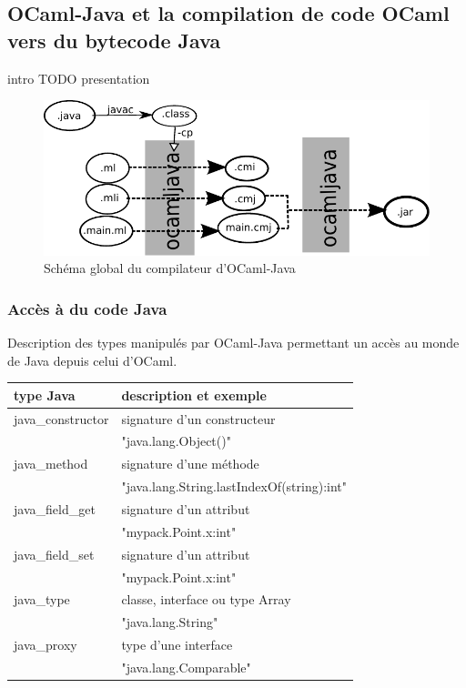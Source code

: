 \documentclass[a4paper, 11pt, notitlepage]{article}
\begin{document}

\newpage
\subsection{OCaml-Java et la compilation de code OCaml vers du bytecode Java}
intro TODO presentation

\begin{figure}[h]
  \centering
  \includegraphics{schemaOCamlJava.pdf}
  \caption{Schéma global du compilateur d'OCaml-Java}
\end{figure}

\subsubsection{Accès à du code Java}
\noindent
Description des types manipulés par OCaml-Java permettant un accès au
monde de Java depuis celui d'OCaml.  

\begin{tabular}{|l|l|}
  \hline
  type Java & description et exemple \\
  \hline
  java\_constructor & signature d'un constructeur  \\
  &  "java.lang.Object()" \\
  \hline
  java\_method & signature d'une méthode \\
  & "java.lang.String.lastIndexOf(string):int"\\
  \hline
  java\_field\_get & signature d'un attribut\\
  & "mypack.Point.x:int" \\
  \hline
  java\_field\_set & signature d'un attribut\\
  & "mypack.Point.x:int" \\
  \hline
  java\_type & classe, interface ou type Array\\
  & "java.lang.String"\\
  \hline
  java\_proxy & type d'une interface\\
  & "java.lang.Comparable"\\ 
  \hline
\end{tabular}
\end{document}
